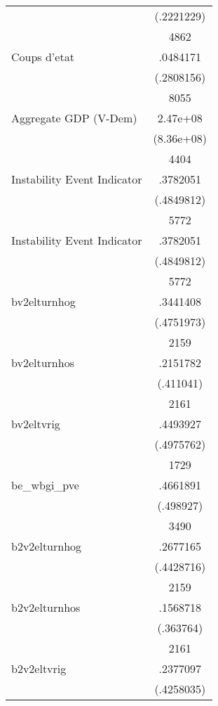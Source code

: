 {\begin{longtable}{l*{1}{c}}
                    &  (.2221229)\\
                    &        4862\\
Coups d'etat        &    .0484171\\
                    &  (.2808156)\\
                    &        8055\\
Aggregate GDP (V-Dem)&    2.47e+08\\
                    &  (8.36e+08)\\
                    &        4404\\
Instability Event Indicator&    .3782051\\
                    &  (.4849812)\\
                    &        5772\\
Instability Event Indicator&    .3782051\\
                    &  (.4849812)\\
                    &        5772\\
bv2elturnhog        &    .3441408\\
                    &  (.4751973)\\
                    &        2159\\
bv2elturnhos        &    .2151782\\
                    &   (.411041)\\
                    &        2161\\
bv2eltvrig          &    .4493927\\
                    &  (.4975762)\\
                    &        1729\\
be\_wbgi\_pve         &    .4661891\\
                    &   (.498927)\\
                    &        3490\\
b2v2elturnhog       &    .2677165\\
                    &  (.4428716)\\
                    &        2159\\
b2v2elturnhos       &    .1568718\\
                    &   (.363764)\\
                    &        2161\\
b2v2eltvrig         &    .2377097\\
                    &  (.4258035)\\

\end{longtable}}

